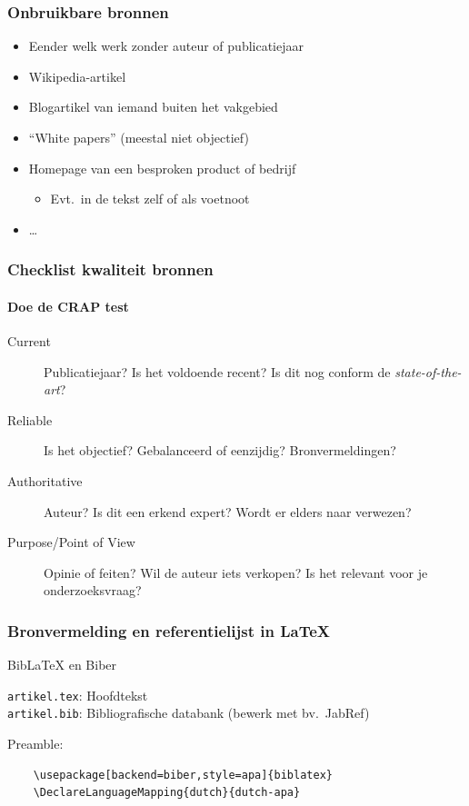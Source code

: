 \documentclass{beamer}
\begin{document}
\begin{frame}
  \frametitle{Onbruikbare bronnen}

  \begin{itemize}
    \item Eender welk werk zonder auteur of publicatiejaar
    \item Wikipedia-artikel
    \item Blogartikel van iemand buiten het vakgebied
    \item ``White papers'' (meestal niet objectief)
    \item Homepage van een besproken product of bedrijf
      \begin{itemize}
        \item Evt.~in de tekst zelf of als voetnoot
      \end{itemize}
    \item \dots
  \end{itemize}
\end{frame}

\begin{frame}
  \frametitle{Checklist kwaliteit bronnen}
  \framesubtitle{Doe de CRAP test}

  \begin{description}
    \item[Current] Publicatiejaar? Is het voldoende recent? Is dit nog conform de \emph{state-of-the-art}?
    \item[Reliable] Is het objectief? Gebalanceerd of eenzijdig? 
    Bronvermeldingen?
    \item[Authoritative] Auteur? Is dit een erkend expert? Wordt er elders naar verwezen?
    \item[Purpose/Point of View] Opinie of feiten? Wil de auteur iets verkopen? Is het relevant voor je onderzoeksvraag?
  \end{description}

\end{frame}

\begin{frame}[fragile]
  \frametitle{Bronvermelding en referentielijst in {\LaTeX}}
  
  Bib{\LaTeX} en Biber

  \vspace{18pt}

  \verb|artikel.tex|: Hoofdtekst\\
  \verb|artikel.bib|: Bibliografische databank (bewerk met bv.~JabRef)

  \vspace{18pt}
  
  Preamble:
  
  \begin{verbatim}
    \usepackage[backend=biber,style=apa]{biblatex}
    \DeclareLanguageMapping{dutch}{dutch-apa}
    
  \end{verbatim}

\end{frame}
\end{document}
